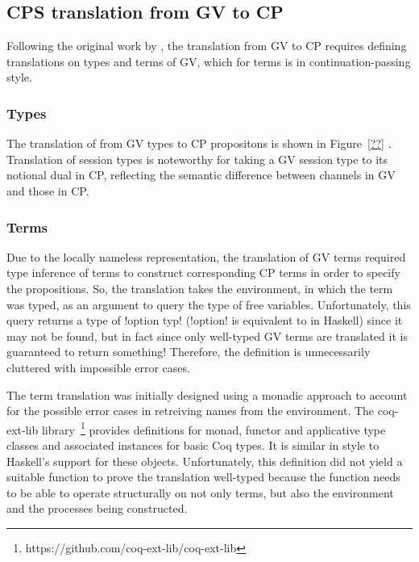 \subsection{CPS translation from GV to CP}\label{sec:trans}

Following the original work by \citeauthor{Wadler:2014}, the translation from
GV to CP requires defining translations on types and terms of GV, which for
terms is in continuation-passing style.

\subsubsection{Types}

The translation of from GV types to CP propositons is shown in Figure~\ref{??}
. Translation of session types is
noteworthy for taking a GV session type to its notional dual in CP, reflecting
the semantic difference between channels in GV and those in CP.

\subsubsection{Terms}

Due to the locally nameless representation, the translation of GV terms
required type inference of terms to construct corresponding CP terms in order
to specify the propositions. So, the translation takes the environment, in
which the term was typed, as an argument to query the type of free
variables. Unfortunately, this query returns a type of \coqe!option typ!
(\coqe!option! is equivalent to  in Haskell) since it may not be
found, but in fact since only well-typed GV terms are translated it is
guaranteed to return something! Therefore, the definition is unnecessarily
cluttered with impossible error cases.

The term translation was initially designed using a monadic approach to
account for the possible error cases in retreiving names from the
environment. The coq-ext-lib
library~\footnote{https://github.com/coq-ext-lib/coq-ext-lib} provides
definitions for monad, functor and applicative type classes and associated
instances for basic Coq types. It is similar in style to Haskell's support for
these objects. Unfortunately, this definition did not yield a suitable
function to prove the translation well-typed because the function needs to be
able to operate structurally on not only terms, but also the environment and
the processes being constructed.

